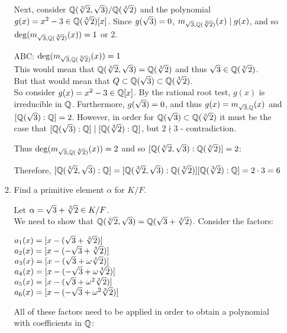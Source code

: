 \documentclass[letterpaper,12pt,fleqn]{article}
\renewcommand{\a}{\alpha}
\newcommand{\w}{\omega}
\begin{document}
\begin{enumerate}
\begin{enumerate}

    Next, consider $\mathbb{Q}(\sqrt[3]{2},\sqrt{3})/\mathbb{Q}(\sqrt[3]{2})$ and the polynomial $g(x)=x^2-3\in\mathbb{Q}(\sqrt[3]{2})[x]$. Since $g(\sqrt{3})=0$,
    $m_{\sqrt{3},\mathbb{Q}(\sqrt[3]{2})}(x)\mid g(x)$, and so $\deg(m_{\sqrt{3},\mathbb{Q}(\sqrt[3]{2})}(x))=1$ or $2$.

    ABC: $\deg(m_{\sqrt{3},\mathbb{Q}(\sqrt[3]{2})}(x))=1$ \\
    This would mean that $\mathbb{Q}(\sqrt[3]{2},\sqrt{3})=\mathbb{Q}(\sqrt[3]{2})$ and thus $\sqrt{3}\in\mathbb{Q}(\sqrt[3]{2})$. \\
    But that would mean that $Q\subset\mathbb{Q}(\sqrt{3})\subset\mathbb{Q}(\sqrt[3]{2})$. \\
    So consider $g(x)=x^2-3\in\mathbb{Q}[x]$. By the rational root test, $g(x)$ is irreducible in
    $\mathbb{Q}$. Furthermore, $g(\sqrt{3})=0$, and thus $g(x)=m_{\sqrt{3},\mathbb{Q}}(x)$ and $[\mathbb{Q}(\sqrt{3}):\mathbb{Q}]=2$.
    However, in order for $\mathbb{Q}(\sqrt{3})\subset\mathbb{Q}(\sqrt[3]{2})$ it must be the case that
    $[\mathbb{Q}(\sqrt{3}):\mathbb{Q}]\mid[\mathbb{Q}(\sqrt[3]{2}):\mathbb{Q}]$, but $2\nmid3$ - contradiction.

    Thus $\deg(m_{\sqrt{3},\mathbb{Q}(\sqrt[3]{2})}(x))=2$ and so $[\mathbb{Q}(\sqrt[3]{2},\sqrt{3}):\mathbb{Q}(\sqrt[3]{2})]=2$:


    Therefore, $[\mathbb{Q}(\sqrt[3]{2},\sqrt{3}):\mathbb{Q}]=[\mathbb{Q}(\sqrt[3]{2},\sqrt{3}):\mathbb{Q}(\sqrt[3]{2})][\mathbb{Q}(\sqrt[3]{2}):\mathbb{Q}]=2\cdot3=6$

    \bigskip

  \item Find a primitive element $\a$ for $K/F$.

    \newcommand{\fa}{\Q(\st+\ct)}

    Let $\a=\st+\ct\in K/F$. \\
    We need to show that $\fk=\fa$.
    Consider the factors:
    
    $a_1(x)=[x-(\sqrt{3}+\sqrt[3]{2})]$ \\
    $a_2(x)=[x-(-\sqrt{3}+\sqrt[3]{2})]$ \\
    $a_3(x)=[x-(\st+\w\ct)]$ \\
    $a_4(x)=[x-(-\st+\w\ct)]$ \\
    $a_5(x)=[x-(\st+\w^2\ct)]$ \\
    $a_6(x)=[x-(-\st+\w^2\ct)]$

    All of these factors need to be applied in order to obtain a polynomial with
    coefficients in $\mathbb{Q}$:
    

\end{enumerate}
\end{enumerate}
\end{document}

